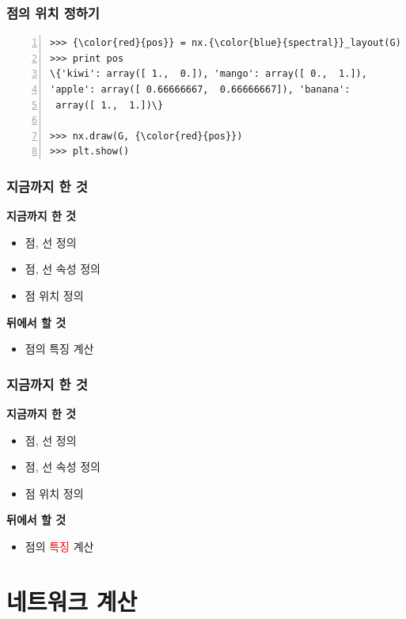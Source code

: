 \documentclass{beamer}
\begin{document}
\begin{frame}[fragile]
\frametitle{점의 위치 정하기}
\begin{block}{}
\begin{Verbatim}[numbers=left,commandchars=\\\{\}]
>>> {\color{red}{pos}} = nx.{\color{blue}{spectral}}_layout(G) \color{gray}{% nx.spring_layout, ...}
>>> print pos
\{'kiwi': array([ 1.,  0.]), 'mango': array([ 0.,  1.]), 
'apple': array([ 0.66666667,  0.66666667]), 'banana':
 array([ 1.,  1.])\}
 
>>> nx.draw(G, {\color{red}{pos}})
>>> plt.show()
\end{Verbatim}
\end{block}
\end{frame}

\begin{frame}
\frametitle{지금까지 한 것}
\textbf{지금까지 한 것}
\begin{itemize}
\item 점, 선 정의
\item 점, 선 속성 정의
\item 점 위치 정의
\end{itemize}
{\color{white}
\textbf{뒤에서 할 것}
\begin{itemize}
\item \color{white}점의 특징 계산
\end{itemize}
}
\end{frame}

\begin{frame}
\frametitle{지금까지 한 것}
\textbf{지금까지 한 것}
\begin{itemize}
\item 점, 선 정의
\item 점, 선 속성 정의
\item 점 위치 정의
\end{itemize}
\textbf{뒤에서 할 것}
\begin{itemize}
\item 점의 {\textcolor{red}{특징}} 계산
\end{itemize}
\end{frame}

\section{네트워크 계산}
\end{document}
